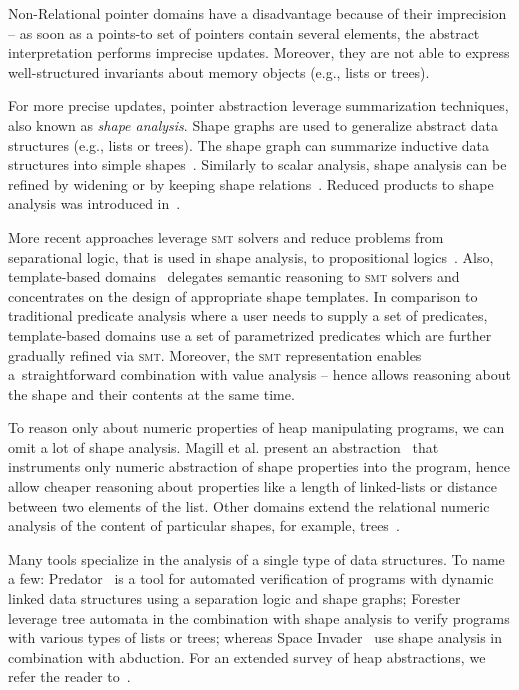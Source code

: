 Non-Relational pointer domains have a disadvantage because of their imprecision
-- as soon as a points-to set of pointers contain several elements, the
abstract interpretation performs imprecise updates. Moreover, they are not able
to express well-structured invariants about memory objects (e.g., lists or trees).

For more precise updates, pointer abstraction leverage summarization
techniques, also known as \emph{shape analysis}. Shape graphs are used to
generalize abstract data structures (e.g., lists or trees). The shape graph can
summarize inductive data structures into simple shapes~\cite{Distefano2006}.
Similarly to scalar analysis, shape analysis can be refined by widening or by
keeping shape relations~\cite{Chang2008}.  Reduced products to shape analysis
was introduced in~\cite{Toubhans2013}.

More recent approaches leverage \textsc{smt} solvers and reduce problems from
separational logic, that is used in shape analysis, to propositional
logics~\cite{Piskac2013, Itzhaky2014, Itzhaky2014b}.  Also, template-based
domains~\cite{Malik2018} delegates semantic reasoning to \textsc{smt} solvers
and concentrates on the design of appropriate shape templates.  In comparison
to traditional predicate analysis where a user needs to supply a set of
predicates, template-based domains use a set of parametrized predicates which
are further gradually refined via \textsc{smt}.  Moreover, the \textsc{smt}
representation enables a~straightforward combination with value analysis --
hence allows reasoning about the shape and their contents at the same time.

To reason only about numeric properties of heap manipulating programs, we can
omit a lot of shape analysis. Magill et al. present an
abstraction~\cite{Magill2010} that instruments only numeric abstraction of
shape properties into the program, hence allow cheaper reasoning about
properties like a length of linked-lists or distance between two elements of
the list. Other domains extend the relational numeric analysis of the content
of particular shapes, for example, trees~\cite{Journault2019}.

Many tools specialize in the analysis of a single type of data structures. To
name a few: Predator~\cite{Dudka2012} is a tool for automated verification of programs with
dynamic linked data structures using a separation logic and shape
graphs; Forester~\cite{Holik2015} leverage tree automata in the combination
with shape analysis to verify programs with various types of lists or
trees; whereas Space Invader~\cite{Yang2008} use shape
analysis in combination with abduction. For an extended survey of heap
abstractions, we refer the reader to~\cite{Kanvar2016}.

